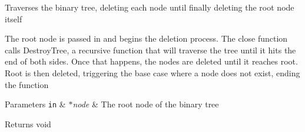 Traverses the binary tree, deleting each node until finally deleting the root node itself

The root node is passed in and begins the deletion process. The close function calls Destroy\+Tree, a recursive function that will traverse the tree until it hits the end of both sides. Once that happens, the nodes are deleted until it reaches root. Root is then deleted, triggering the base case where a node does not exist, ending the function


\begin{DoxyParams}[1]{Parameters}
\mbox{\tt in}  & {\em $\ast$node} & The root node of the binary tree \\
\hline
\end{DoxyParams}
\begin{DoxyReturn}{Returns}
void 
\end{DoxyReturn}
